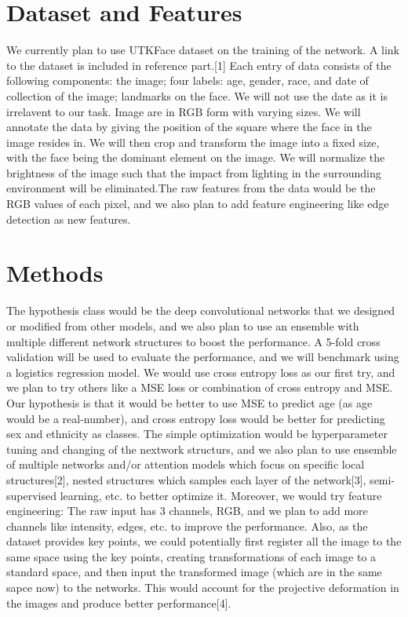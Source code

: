 \documentclass{article}
\begin{document}
\section{Dataset and Features}
We currently plan to use UTKFace dataset on the training of the network. A link to the dataset is included in reference part.[1] Each entry of data consists of the following components: the image; four labels: age, gender, race, and date of collection of the image; landmarks on the face. We will not use the date as it is irrelavent to our task. Image are in RGB form with varying sizes. We will annotate the data by giving the position of the square where the face in the image resides in. We will then crop and transform the image into a fixed size, with the face being the dominant element on the image. We will normalize the brightness of the image such that the impact from lighting in the surrounding environment will be eliminated.The raw features from the data would be the RGB values of each pixel, and we also plan to add feature engineering like edge detection as new features.

\section{Methods}
The hypothesis class would be the deep convolutional networks that we designed or modified from other models, and we also plan to use an ensemble with multiple different network structures to boost the performance. A 5-fold cross validation will be used to evaluate the performance, and we will benchmark using a logistics regression model. We would use cross entropy loss as our first try, and we plan to try others like a MSE loss or combination of cross entropy and MSE. Our hypothesis is that it would be better to use MSE to predict age (as age would be a real-number), and cross entropy loss would be better for predicting sex and ethnicity as classes. The simple optimization would be hyperparameter tuning and changing of the nextwork structurs, and we also plan to use ensemble of multiple networks and/or attention models which focus on specific local structures[2], nested structures which samples each layer of the network[3], semi-supervised learning, etc. to better optimize it. Moreover, we would try feature engineering: The raw input has 3 channels, RGB, and we plan to add more channels like intensity, edges, etc. to improve the performance. Also, as the dataset provides key points, we could potentially first register all the image to the same space using the key points, creating transformations of each image to a standard space, and then input the transformed image (which are in the same sapce now) to the networks. This would account for the projective deformation in the images and produce better performance[4]. 
\end{document}
